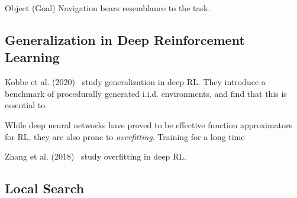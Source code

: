 Object (Goal) Navigation bears resemblance to the task. 

\subsection{Generalization in Deep Reinforcement Learning}




Kobbe et al. (2020)~\cite{cobbe_procgen_2020} study generalization in deep RL. They introduce a benchmark of procedurally generated i.i.d. environments, and find that this is essential to 

While deep neural networks have proved to be effective function approximators for RL, they are also prone to \textit{overfitting}.
Training for a long time 

Zhang et al. (2018)~\cite{zhang_overfitting_2018} study overfitting in deep RL. 

\subsection{Local Search}






